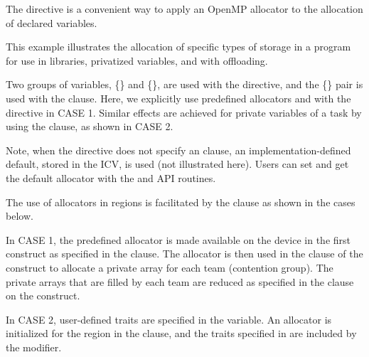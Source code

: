 \pagebreak


The  directive is a convenient way to apply an OpenMP 
allocator to the allocation of declared variables.

This example illustrates the allocation of specific types of storage in a program 
for use in libraries, privatized variables, and with offloading.

Two groups of variables, \{\} and \{\}, are used with the  
directive, and the \{\} pair is used with the  clause. 
Here, we explicitly use predefined allocators  and 
with the  directive in CASE 1. Similar effects are achieved for private variables of a task
by using the  clause, as shown in CASE 2.  

Note, when the  directive does not specify an  clause, an
implementation-defined default, stored in the  ICV, is used
(not illustrated here).
Users can set and get the default allocator with the 
and  API routines. 



The use of allocators in  regions is facilitated by the
 clause as shown in the cases below.

In CASE 1, the predefined  allocator is made available on the
device in the first  construct as specified in the  clause.
The allocator is then used in the 
clause of the  construct to allocate a private array for each
team (contention group). The private  arrays that are filled by each
team are reduced as specified in the  clause on the  construct.

In CASE 2, user-defined traits are specified in the  variable.
An allocator is initialized for the  region in the  clause,
and the traits specified in  are included by the  modifier.

